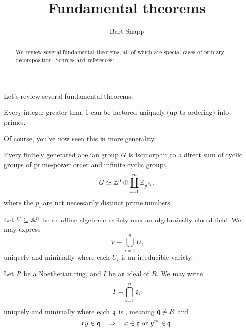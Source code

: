\documentclass{ximera}
\author{Bart Snapp}
\title{Fundamental theorems}
\begin{document}
\begin{abstract}
  We review several fundamental theorems, all of which are special
  cases of primary decomposition. Sources and references:
  \cite{dE1995,hS2003}.
\end{abstract}
\maketitle

Let's review several fundamental theorems:

\begin{theorem}
  Every integer greater than $1$ can be factored uniquely (up to
  ordering) into primes.
\end{theorem}

Of course, you've now seen this in more generality.


\begin{theorem}
  Every finitely generated abelian group $G$ is isomorphic to a
  direct sum of cyclic groups of prime-power order and infinite cyclic
  groups,
  \[
  G \simeq \mathbb Z^n \oplus \coprod_{i=1}^{m} \mathbb Z_{p_i^{k_i}},
  \]
  where the $p_i$ are not necessarily distinct prime numbers.
\end{theorem}


\begin{theorem}
  Let $V\subseteq\mathbb A^n$ be an affine algebraic variety over an
  algebraically closed field. We may express
  \[
  V = \bigcup_{i=1}^n U_i
  \]
  uniquely and minimally where each $U_i$ is an irreducible variety.
\end{theorem}


\begin{theorem}
  Let $R$ be a Noetherian ring, and $I$ be an ideal of $R$. We may write
  \[
  I = \bigcap_{i=1}^n \mathfrak{q}_i
  \]
  uniquely and minimally where each $\mathfrak{q}$ is , meaning $\mathfrak{q}\ne R$ and
  \[
  xy\in\mathfrak{q} \quad \Rightarrow \quad x\in\mathfrak{q}\text{ or }y^m\in\mathfrak{q}.
  \]
\end{theorem}
\end{document}

